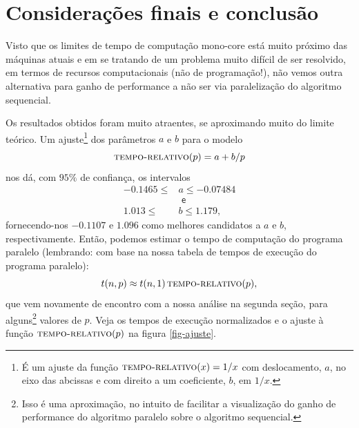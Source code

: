 \documentclass[a4paper,article,10pt]{article}
\newcommand{\e}{\textsf{ e }}
\begin{document}
  \section{Considerações finais e conclusão}

    Visto que os limites de tempo de computação mono-core está muito próximo das
    máquinas atuais e em se tratando de um problema muito difícil de ser
    resolvido, em termos de recursos computacionais (não de programação!), não
    vemos outra alternativa para ganho de performance a não ser via
    paralelização do algoritmo sequencial.

    Os resultados obtidos foram muito atraentes, se aproximando muito do limite
    teórico. Um ajuste\footnote{É um ajuste da função
      $\textsc{tempo-relativo}(x) = 1/x$ com deslocamento, $a$, no eixo das
      abcissas  e com direito a um coeficiente, $b$, em $1/x$.} dos parâmetros
    $a$ e $b$ para o modelo
    \begin{equation*}
      \textsc{tempo-relativo}(p) = a + b/p
    \end{equation*}
    nos dá, com $95\%$ de confiança, os intervalos
    \begin{align*}
      -0.1465 \leq &a \leq -0.07484 \\
      &\e \\
      1.013 \leq &b \leq 1.179,
    \end{align*}
    fornecendo-nos $-0.1107$ e $1.096$ como melhores candidatos a $a$ e $b$,
    respectivamente.
    Então, podemos estimar o tempo de computação do programa paralelo
    (lembrando: com base na nossa tabela de tempos de execução do programa
    paralelo):
    \begin{equation*}
      t(n, p) \approx t(n, 1) \,\textsc{tempo-relativo}(p),
    \end{equation*}
    que vem novamente de encontro com a nossa análise na segunda seção, para
    alguns\footnote{Isso é uma aproximação, no intuito de facilitar a
      visualização do ganho de performance do algoritmo paralelo sobre o
      algoritmo sequencial.} valores de $p$.
    Veja os tempos de execução normalizados e o ajuste à função
    $\textsc{tempo-relativo}(p)$ na figura \ref{fig-ajuste}.
\end{document}
